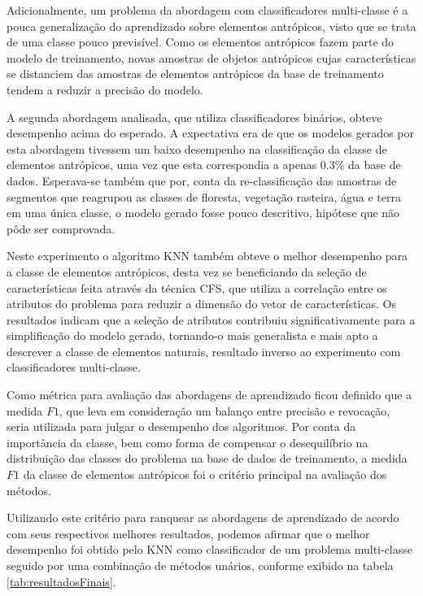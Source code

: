 Adicionalmente, um problema da abordagem com classificadores multi-classe é a pouca generalização do aprendizado sobre elementos antrópicos, visto que se trata de uma classe pouco previsível. Como os elementos antrópicos fazem parte do modelo de treinamento, novas amostras de objetos antrópicos cujas características se distanciem das amostras de elementos antrópicos da base de treinamento tendem a reduzir a precisão do modelo.

A segunda abordagem analisada, que utiliza classificadores binários, obteve desempenho acima do esperado. A expectativa era de que os modelos gerados por esta abordagem tivessem um baixo desempenho na classificação da classe de elementos antrópicos, uma vez que esta correspondia a apenas 0.3\% da base de dados. Esperava-se também que por, conta da re-classificação das amostras de segmentos que reagrupou as classes de floresta, vegetação rasteira, água e terra em uma única classe, o modelo gerado fosse pouco descritivo, hipótese que não pôde ser comprovada.

Neste experimento o algoritmo KNN também obteve o melhor desempenho para a classe de elementos antrópicos, desta vez se beneficiando da seleção de características feita através da técnica CFS, que utiliza a correlação entre os atributos do problema para reduzir a dimensão do vetor de características. Os resultados indicam que a seleção de atributos contribuiu significativamente para a simplificação do modelo gerado, tornando-o mais generalista e mais apto a descrever a classe de elementos naturais, resultado inverso ao experimento com classificadores multi-classe.



Como métrica para avaliação das abordagens de aprendizado ficou definido que a medida $F1$, que leva em consideração um balanço entre precisão e revocação, seria utilizada para julgar o desempenho dos algoritmos. Por conta da importância da classe, bem como forma de compensar o desequilíbrio na distribuição das classes do problema na base de dados de treinamento, a medida $F1$ da classe de elementos antrópicos foi o critério principal na avaliação dos métodos.

Utilizando este critério para ranquear as abordagens de aprendizado de acordo com seus respectivos melhores resultados, podemos afirmar que o melhor desempenho foi obtido pelo KNN como classificador de um problema multi-classe seguido por uma combinação de métodos unários, conforme exibido na tabela \ref{tab:resultadosFinais}.

